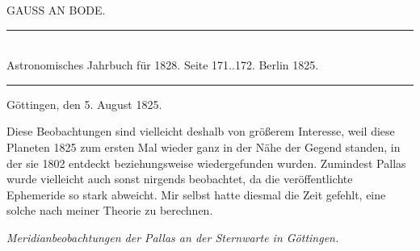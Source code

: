 \clearpage
{}

\begin{center}
{\large GAUSS AN BODE.}
\end{center}

\begin{center}
\rule{6cm}{0.4pt}\\
Astronomisches Jahrbuch für 1828. Seite 171..172. Berlin 1825.\\
\rule{6cm}{0.4pt}
\end{center}

\begin{flushright}
Göttingen, den 5. August 1825.
\end{flushright}

Diese Beobachtungen sind vielleicht deshalb von größerem Interesse, weil diese Planeten 1825 zum ersten Mal wieder ganz in der Nähe der Gegend standen, in der sie 1802 entdeckt beziehungsweise wiedergefunden wurden. Zumindest Pallas wurde vielleicht auch sonst nirgends beobachtet, da die veröffentlichte Ephemeride so stark abweicht. Mir selbst hatte diesmal die Zeit gefehlt, eine solche nach meiner Theorie zu berechnen.

\begin{center}
\emph{Meridianbeobachtungen der Pallas an der Sternwarte in Göttingen.}
\end{center}

